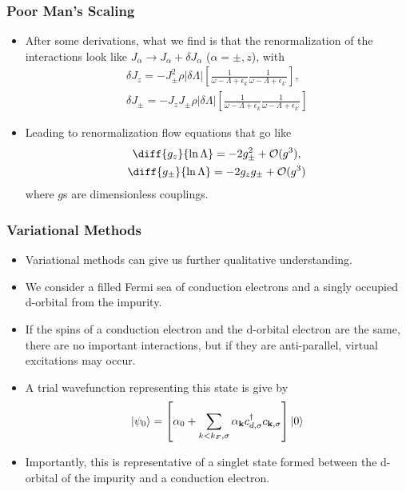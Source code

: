 \documentclass{beamer}
\newcommand{\vv}[1]{\mathbf{\bm{#1}}}
\newcommand{\abs}[1]{\lvert #1 \rvert}
\begin{document}
\begin{frame}
  \frametitle{Poor Man's Scaling}

  \begin{itemize}
  \item After some derivations, what we find is that the renormalization of the interactions look like $J_\alpha \rightarrow J_\alpha + \delta J_\alpha$ ($\alpha=\pm,z$), with
    \begin{gather*}
      \delta J_z = -J_\pm^2 \rho \abs{\delta\Lambda} \left[ \frac{1}{\omega - \Lambda + \epsilon_k} \frac{1}{\omega - \Lambda + \epsilon_{k'}}\right], \\
      \delta J_\pm = -J_z J_\pm \rho \abs{\delta\Lambda} \left[ \frac{1}{\omega - \Lambda + \epsilon_k} \frac{1}{\omega - \Lambda + \epsilon_{k'}}\right]
    \end{gather*}
  \item Leading to renormalization flow equations that go like
    \begin{gather*}
      \diff{g_z}{\ln \Lambda} = -2g_\pm^2 + \mathcal{O}(g^3), \\
      \diff{g_\pm}{\ln \Lambda} = -2g_z g_\pm + \mathcal{O}(g^3)
    \end{gather*}
    where $g$s are dimensionless couplings.
  \end{itemize}
  
\end{frame}


\begin{frame}
  \frametitle{Variational Methods}

  \begin{itemize}
  \item Variational methods can give us further qualitative understanding.
  \item We consider a filled Fermi sea of conduction electrons and a singly occupied d-orbital from the impurity.
  \item If the spins of a conduction electron and the d-orbital electron are the same, there are no important interactions, but if they are anti-parallel, virtual excitations may occur.
  \item A trial wavefunction representing this state is give by
    \begin{gather*}
      \ket{\psi_0} = \left[ \alpha_0 + \sum_{k<k_F,\sigma} \alpha_{\vv{k}}c^\dagger_{d,\sigma}c_{\vv{k},\sigma} \right]\ket{0}
    \end{gather*}
  \item Importantly, this is representative of a singlet state formed between the d-orbital of the impurity and a conduction electron.
  \end{itemize}
\end{frame}
\end{document}
